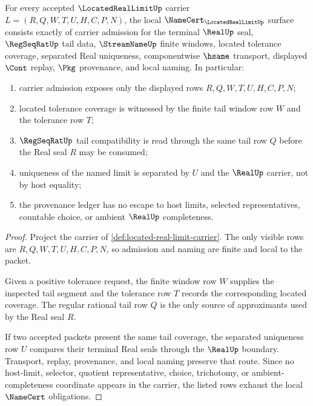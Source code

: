 \begin{theorem}
\label{thm:located-real-limit-namecert-obligations}
For every accepted $\LocatedRealLimitUp$ carrier $L=(R,Q,W,T,U,H,C,P,N)$, the local $\NameCert_{\LocatedRealLimitUp}$ surface consists exactly of carrier admission for the terminal $\RealUp$ seal, $\RegSeqRatUp$ tail data, $\StreamNameUp$ finite windows, located tolerance coverage, separated Real uniqueness, componentwise $\hsame$ transport, displayed $\Cont$ replay, $\Pkg$ provenance, and local naming. In particular:
\begin{enumerate}
\item carrier admission exposes only the displayed rows $R,Q,W,T,U,H,C,P,N$;
\item located tolerance coverage is witnessed by the finite tail window row $W$ and the tolerance row $T$;
\item $\RegSeqRatUp$ tail compatibility is read through the same tail row $Q$ before the Real seal $R$ may be consumed;
\item uniqueness of the named limit is separated by $U$ and the $\RealUp$ carrier, not by host equality;
\item the provenance ledger has no escape to host limits, selected representatives, countable choice, or ambient $\RealUp$ completeness.
\end{enumerate}
\end{theorem}
\begin{proof}
Project the carrier of \autoref{def:located-real-limit-carrier}. The only visible rows are $R,Q,W,T,U,H,C,P,N$, so admission and naming are finite and local to the packet.

Given a positive tolerance request, the finite window row $W$ supplies the inspected tail segment and the tolerance row $T$ records the corresponding located coverage. The regular rational tail row $Q$ is the only source of approximants used by the Real seal $R$.

If two accepted packets present the same tail coverage, the separated uniqueness row $U$ compares their terminal Real seals through the $\RealUp$ boundary. Transport, replay, provenance, and local naming preserve that route. Since no host-limit, selector, quotient representative, choice, trichotomy, or ambient-completeness coordinate appears in the carrier, the listed rows exhaust the local $\NameCert$ obligations.
\end{proof}

